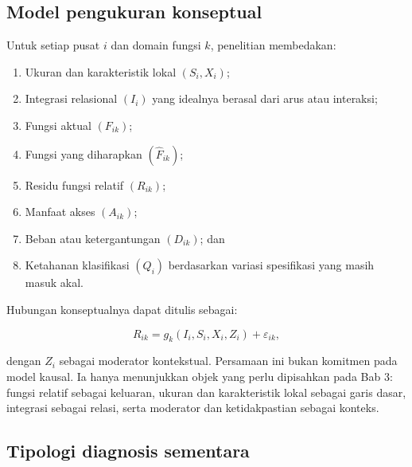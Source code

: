 \documentclass[11pt,a4paper,oneside,openany,indonesian]{report}
\begin{document}
\subsection{Model pengukuran konseptual}

Untuk setiap pusat $i$ dan domain fungsi $k$, penelitian membedakan:

\begin{enumerate}
  \item Ukuran dan karakteristik lokal $(S_i,X_i)$;
  \item Integrasi relasional $(I_i)$ yang idealnya berasal dari arus atau interaksi;
  \item Fungsi aktual $(F_{ik})$;
  \item Fungsi yang diharapkan $(\widehat{F}_{ik})$;
  \item Residu fungsi relatif $(R_{ik})$;
  \item Manfaat akses $(A_{ik})$;
  \item Beban atau ketergantungan $(D_{ik})$; dan
  \item Ketahanan klasifikasi $(Q_i)$ berdasarkan variasi spesifikasi yang masih masuk akal.
\end{enumerate}

Hubungan konseptualnya dapat ditulis sebagai:

\[
R_{ik}=g_k(I_i,S_i,X_i,Z_i)+\varepsilon_{ik},
\]

\noindent dengan $Z_i$ sebagai moderator kontekstual. Persamaan ini bukan komitmen pada model kausal. Ia hanya menunjukkan objek yang perlu dipisahkan pada Bab 3: fungsi relatif sebagai keluaran, ukuran dan karakteristik lokal sebagai garis dasar, integrasi sebagai relasi, serta moderator dan ketidakpastian sebagai konteks.

\subsection{Tipologi diagnosis sementara}
\end{document}
